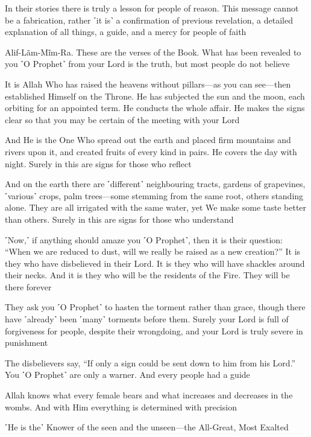 In their stories there is truly a lesson for people of reason. This message cannot be a fabrication, rather ˹it is˺ a confirmation of previous revelation, a detailed explanation of all things, a guide, and a mercy for people of faith

Alif-Lãm-Mĩm-Ra. These are the verses of the Book. What has been revealed to you ˹O Prophet˺ from your Lord is the truth, but most people do not believe

It is Allah Who has raised the heavens without pillars—as you can see—then established Himself on the Throne. He has subjected the sun and the moon, each orbiting for an appointed term. He conducts the whole affair. He makes the signs clear so that you may be certain of the meeting with your Lord

And He is the One Who spread out the earth and placed firm mountains and rivers upon it, and created fruits of every kind in pairs. He covers the day with night. Surely in this are signs for those who reflect

And on the earth there are ˹different˺ neighbouring tracts, gardens of grapevines, ˹various˺ crops, palm trees—some stemming from the same root, others standing alone. They are all irrigated with the same water, yet We make some taste better than others. Surely in this are signs for those who understand

˹Now,˺ if anything should amaze you ˹O Prophet˺, then it is their question: “When we are reduced to dust, will we really be raised as a new creation?” It is they who have disbelieved in their Lord. It is they who will have shackles around their necks. And it is they who will be the residents of the Fire. They will be there forever

They ask you ˹O Prophet˺ to hasten the torment rather than grace, though there have ˹already˺ been ˹many˺ torments before them. Surely your Lord is full of forgiveness for people, despite their wrongdoing, and your Lord is truly severe in punishment

The disbelievers say, “If only a sign could be sent down to him from his Lord.” You ˹O Prophet˺ are only a warner. And every people had a guide

Allah knows what every female bears and what increases and decreases in the wombs. And with Him everything is determined with precision

˹He is the˺ Knower of the seen and the unseen—the All-Great, Most Exalted


